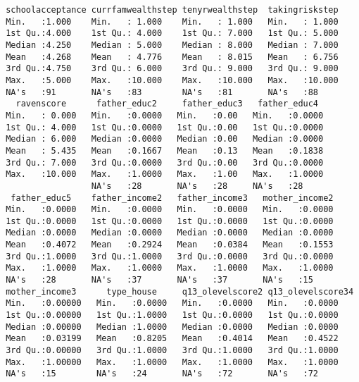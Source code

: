 \begin{verbatim}
 schoolacceptance currfamwealthstep tenyrwealthstep  takingriskstep  
 Min.   :1.000    Min.   : 1.000    Min.   : 1.000   Min.   : 1.000  
 1st Qu.:4.000    1st Qu.: 4.000    1st Qu.: 7.000   1st Qu.: 5.000  
 Median :4.250    Median : 5.000    Median : 8.000   Median : 7.000  
 Mean   :4.268    Mean   : 4.776    Mean   : 8.015   Mean   : 6.756  
 3rd Qu.:4.750    3rd Qu.: 6.000    3rd Qu.: 9.000   3rd Qu.: 9.000  
 Max.   :5.000    Max.   :10.000    Max.   :10.000   Max.   :10.000  
 NA's   :91       NA's   :83        NA's   :81       NA's   :88      
   ravenscore      father_educ2     father_educ3   father_educ4   
 Min.   : 0.000   Min.   :0.0000   Min.   :0.00   Min.   :0.0000  
 1st Qu.: 4.000   1st Qu.:0.0000   1st Qu.:0.00   1st Qu.:0.0000  
 Median : 6.000   Median :0.0000   Median :0.00   Median :0.0000  
 Mean   : 5.435   Mean   :0.1667   Mean   :0.13   Mean   :0.1838  
 3rd Qu.: 7.000   3rd Qu.:0.0000   3rd Qu.:0.00   3rd Qu.:0.0000  
 Max.   :10.000   Max.   :1.0000   Max.   :1.00   Max.   :1.0000  
                  NA's   :28       NA's   :28     NA's   :28      
  father_educ5    father_income2   father_income3   mother_income2  
 Min.   :0.0000   Min.   :0.0000   Min.   :0.0000   Min.   :0.0000  
 1st Qu.:0.0000   1st Qu.:0.0000   1st Qu.:0.0000   1st Qu.:0.0000  
 Median :0.0000   Median :0.0000   Median :0.0000   Median :0.0000  
 Mean   :0.4072   Mean   :0.2924   Mean   :0.0384   Mean   :0.1553  
 3rd Qu.:1.0000   3rd Qu.:1.0000   3rd Qu.:0.0000   3rd Qu.:0.0000  
 Max.   :1.0000   Max.   :1.0000   Max.   :1.0000   Max.   :1.0000  
 NA's   :28       NA's   :37       NA's   :37       NA's   :15      
 mother_income3      type_house     q13_olevelscore2 q13_olevelscore34
 Min.   :0.00000   Min.   :0.0000   Min.   :0.0000   Min.   :0.0000   
 1st Qu.:0.00000   1st Qu.:1.0000   1st Qu.:0.0000   1st Qu.:0.0000   
 Median :0.00000   Median :1.0000   Median :0.0000   Median :0.0000   
 Mean   :0.03199   Mean   :0.8205   Mean   :0.4014   Mean   :0.4522   
 3rd Qu.:0.00000   3rd Qu.:1.0000   3rd Qu.:1.0000   3rd Qu.:1.0000   
 Max.   :1.00000   Max.   :1.0000   Max.   :1.0000   Max.   :1.0000   
 NA's   :15        NA's   :24       NA's   :72       NA's   :72       
    \end{verbatim}

 
